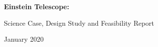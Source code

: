\documentclass[url, 11pt, fleqn, openany, chapterprefix=off]{scrbook}
\begin{document}
{\huge\bfseries
\noindent Einstein Telescope:

\vspace{2mm}
\noindent Science Case, Design Study and Feasibility 
Report}

\vspace{3mm}
{\noindent\Large January 2020}

\vspace{6mm}

%







%
%
%

%

%

\end{document}
